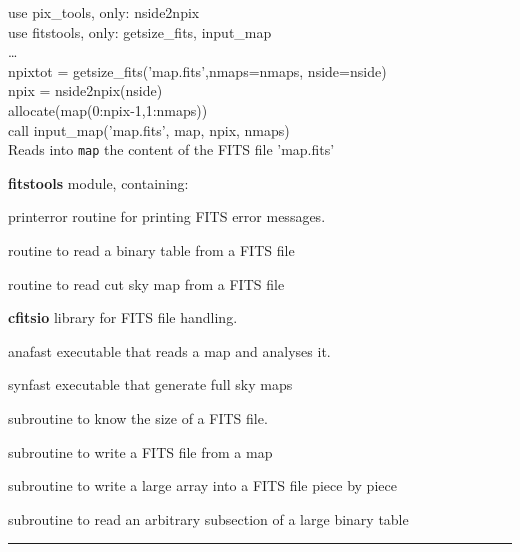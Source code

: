 \begin{example}
{
use pix\_tools, only: nside2npix \\
use fitstools, only: getsize\_fits, input\_map \\
\ldots \\
npixtot = getsize\_fits('map.fits',nmaps=nmaps, nside=nside) \\
npix = nside2npix(nside) \\
allocate(map(0:npix-1,1:nmaps)) \\
call input\_map('map.fits', map, npix, nmaps)  \\
}
{
Reads into {\tt map} the content of the FITS file 'map.fits'
}
\end{example}
\begin{modules}
  \begin{sulist}{} %
  \item[\textbf{fitstools}] module, containing:
  \item[printerror] routine for printing FITS error messages.
  \item[\htmlref{read\_bintab}{sub:read_bintab}] routine to read a binary table
  from a FITS file
  \item[\htmlref{read\_fits\_cut4}{sub:read_fits_cut4}] routine to read cut sky
  map from a FITS file
  \item[\textbf{cfitsio}] library for FITS file handling.
  \end{sulist}
\end{modules}

\begin{related}
  \begin{sulist}{} %
  \item[anafast] executable that reads a \healpix map and analyses it. 
  \item[synfast] executable that generate full sky \healpix maps
  \item[\htmlref{getsize\_fits}{sub:getsize_fits}] subroutine to know the size of a FITS file.
  \item[\htmlref{output\_map}{sub:output_map}] subroutine to write a FITS file
  from a \healpix map
  \item[\htmlref{write\_bintabh}{sub:write_bintabh}] subroutine to write a large
  array into a FITS file piece by piece
  \item[\htmlref{input\_tod*}{sub:input_tod}] subroutine to read an arbitrary subsection of
  a large binary table
  \end{sulist}
\end{related}

\rule{\hsize}{2mm}

\newpage
